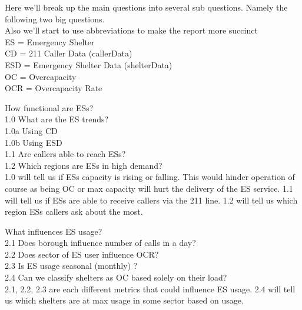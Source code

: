 \documentclass[
]{article}
\begin{document}
Here we'll break up the main questions into several sub questions.
Namely the following two big questions.\\
Also we'll start to use abbreviations to make the report more succinct\\
ES = Emergency Shelter\\
CD = 211 Caller Data (callerData)\\
ESD = Emergency Shelter Data (shelterData)\\
OC = Overcapacity\\
OCR = Overcapacity Rate

How functional are ESs?\\
\hspace*{0.333em} 1.0 What are the ES trends?\\
\hspace*{0.333em}\hspace*{0.333em} 1.0a Using CD\\
\hspace*{0.333em}\hspace*{0.333em} 1.0b Using ESD\\
\hspace*{0.333em} 1.1 Are callers able to reach ESs?\\
\hspace*{0.333em} 1.2 Which regions are ESs in high demand?\\
1.0 will tell us if ESs capacity is rising or falling. This would hinder
operation of course as being OC or max capacity will hurt the delivery
of the ES service. 1.1 will tell us if ESs are able to receive callers
via the 211 line. 1.2 will tell us which region ESs callers ask about
the most.

What influences ES usage?\\
\hspace*{0.333em} 2.1 Does borough influence number of calls in a day?\\
\hspace*{0.333em} 2.2 Does sector of ES user influence OCR?\\
\hspace*{0.333em} 2.3 Is ES usage seasonal (monthly) ?\\
\hspace*{0.333em} 2.4 Can we classify shelters as OC based solely on
their load?\\
2.1, 2.2, 2.3 are each different metrics that could influence ES usage.
2.4 will tell us which shelters are at max usage in some sector based on
usage.
\end{document}
